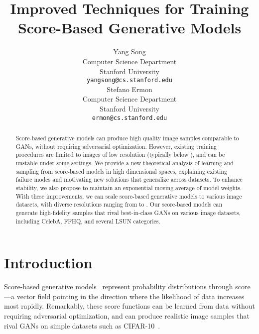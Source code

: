 \documentclass{article}
\title{Improved Techniques for Training Score-Based Generative Models}
\author{Yang Song \\
  Computer Science Department\\
  Stanford University \\
  \texttt{yangsong@cs.stanford.edu} \\
  \And
  Stefano Ermon\\
  Computer Science Department\\
  Stanford University\\
  \texttt{ermon@cs.stanford.edu}
}
\begin{document}
\maketitle
\begin{abstract}
Score-based generative models can produce high quality image samples comparable to GANs, without requiring adversarial optimization. However, existing training procedures are limited to images of low resolution (typically below ), and can be unstable under some settings. We provide a new theoretical analysis of learning and sampling from score-based models in high dimensional spaces, explaining existing failure modes and motivating new solutions that generalize across datasets. 
To enhance stability, we also propose to maintain an exponential moving average of model weights. With these improvements, we can scale score-based generative models to various image datasets, with diverse resolutions ranging from  to . Our score-based models can generate high-fidelity samples that rival best-in-class GANs on various image datasets, including CelebA, FFHQ, and several LSUN categories.





\end{abstract} \section{Introduction}




Score-based generative models~\cite{song2019generative} represent probability distributions through score---a vector field pointing in the direction where the likelihood of data increases most rapidly. 
Remarkably, these score functions can be learned from data without requiring adversarial optimization, and can produce realistic image samples that rival GANs on simple datasets such as CIFAR-10~\cite{krizhevsky2009learning}. 
\end{document}
